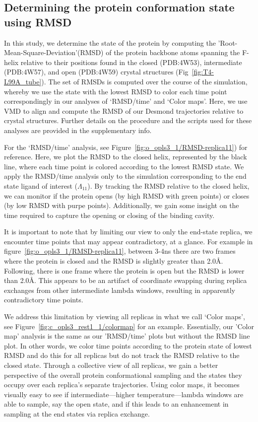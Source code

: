 \documentclass[journal=jctcce,manuscript=article]{achemso}
\begin{document}
\subsection*{Determining the protein conformation state using RMSD}
In this study, we determine the state of the protein by computing the 'Root-Mean-Square-Deviation'(RMSD) of the protein backbone atoms spanning the F-helix relative to their positions found in the closed (PDB:4W53), intermediate (PDB:4W57), and open (PDB:4W59) crystal structures (Fig~\ref{fig:T4-L99A_tube}).
The set of RMSDs is computed over the course of the simulation, whereby we use the state with the lowest RMSD to color each time point correspondingly in our analyses of `RMSD/time' and `Color maps'. 
Here, we use VMD \cite{VMDpaper,VMDalignment} to align and compute the RMSD of our Desmond trajectories relative to crystal structures.
Further details on the procedure and the scripts used for these analyses are provided in the supplementary info.

For the `RMSD/time' analysis, see Figure~\ref{fig:o_opls3_1/RMSD-replica11}) for reference. 
Here, we plot the RMSD to the closed helix, represented by the black line, where each time point is colored according to the lowest RMSD state.
We apply the RMSD/time analysis only to the simulation corresponding to the end state ligand of interest ($\Lambda_{11}$).
By tracking the RMSD relative to the closed helix, we can monitor if the protein opens (by high RMSD with green points) or closes (by low RMSD with purpe points).
Additionally, we gain some insight on the time required to capture the opening or closing of the binding cavity.

It is important to note that by limiting our view to only the end-state replica, we encounter time points that may appear contradictory, at a glance. 
For example in figure~\ref{fig:o_opls3_1/RMSD-replica11}, between 3-4ns there are two frames where the protein is closed and the RMSD is slightly greater than 2.0\AA.
Following, there is one frame where the protein is open but the RMSD is lower than 2.0\AA.
This appears to be an artifact of coordinate swapping during replica exchanges from other intermediate lambda windows, resulting in apparently contradictory time points.

We address this limitation by viewing all replicas in what we call `Color maps', see Figure~\ref{fig:c_opls3_rest1_1/colormap} for an example.
Essentially, our 'Color map' analysis is the same as our 'RMSD/time' plots but without the RMSD line plot.
In other words, we color time points according to the protein state of lowest RMSD and do this for all replicas but do not track the RMSD relative to the closed state.
Through a collective view of all replicas, we gain a better perspective of the overall protein conformational sampling and the states they occupy over each replica's separate trajectories. 
Using color maps, it becomes visually easy to see if intermediate---higher temperature---lambda windows are able to sample, say the open state, and if this leads to an enhancement in sampling at the end states via replica exchange.
\end{document}
